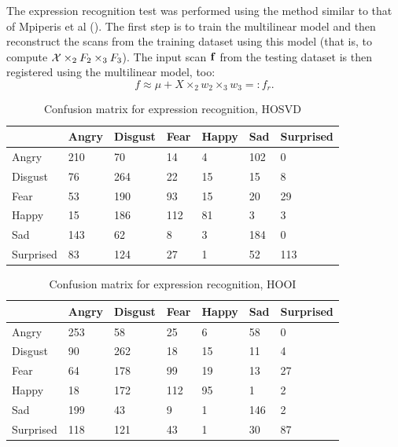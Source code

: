 The expression recognition test was performed using the method similar to that of Mpiperis et al (\cite{?}).
The first step is to train the multilinear model and then reconstruct
the scans from the training dataset using this model (that is, to compute 
$\mathcal{X} \times_2 F_2 \times_3 F_3$).  The input scan ${\mathbf{f}}$ from the testing dataset
is then registered using the multilinear model, too:
\begin{equation}
    f \approx \mu + X \times_2 w_2 \times_3 w_3 =: f_r.
\end{equation}



\begin{table}[h]
\centering
\begin{tabular}{|l|l|l|l|l|l|l|}
\hline
& Angry & Disgust & Fear & Happy & Sad & Surprised \\ \hline
Angry     & 210 &  70 &  14 &  4 &  102 &  0   \\ \hline
Disgust   & 76 &  264 &  22 &  15 &  15 &  8   \\  \hline
Fear      & 53 &  190 &  93 &  15 &  20 &  29   \\ \hline
Happy     & 15 &  186 &  112 &  81 &  3 &  3   \\  \hline
Sad       & 143 &  62 &  8 &  3 &  184 &  0   \\   \hline
Surprised & 83 &  124 &  27 &  1 &  52 &  113  \\ \hline
\end{tabular}
\caption{Confusion matrix for expression recognition, HOSVD }
\label{expr_rec_hosvd_confmatr}
\end{table}


\begin{table}[h]
\centering
\begin{tabular}{|l|l|l|l|l|l|l|}
\hline
& Angry & Disgust & Fear & Happy & Sad & Surprised \\ \hline
Angry     & 253 &  58 &  25 &  6 &  58 &  0   \\  \hline
Disgust   & 90 &  262 &  18 &  15 &  11 &  4   \\  \hline
Fear      & 64 &  178 &  99 &  19 &  13 &  27   \\ \hline
Happy     & 18 &  172 &  112 &  95 &  1 &  2   \\  \hline
Sad       & 199 &  43 &  9 &  1 &  146 &  2   \\   \hline
Surprised & 118 &  121 &  43 &  1 &  30 &  87  \\\hline
\end{tabular}
\caption{Confusion matrix for expression recognition, HOOI }
\label{expr_rec_hooi_confmatr}
\end{table}



